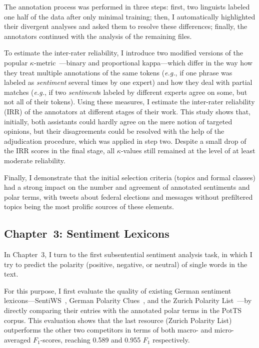 \documentclass[11pt]{article}
\newcommand{\eg}{\textit{e.g.},}
\newcommand{\F}[0]{$F_1$}
\renewcommand{\cite}{\citep}
\begin{document}
The annotation process was performed in three steps: first, two
linguists labeled one half of the data after only minimal training;
then, I automatically highlighted their divergent analyses and asked
them to resolve these differences; finally, the annotators continued
with the analysis of the remaining files.

To estimate the inter-rater reliability, I introduce two modified
versions of the popular $\kappa$-metric~\cite{Cohen:60}---binary and
proportional kappa---which differ in the way how they treat multiple
annotations of the same tokens (\eg{} if one phrase was labeled as
\emph{sentiment} several times by one expert) and how they deal with
partial matches (\eg{} if two \emph{sentiment}s labeled by different
experts agree on some, but not all of their tokens).  Using these
measures, I estimate the inter-rater reliability (IRR) of the
annotators at different stages of their work.  This study shows that,
initially, both assistants could hardly agree on the mere notion of
targeted opinions, but their disagreements could be resolved with the
help of the adjudication procedure, which was applied in step two.
Despite a small drop of the IRR scores in the final stage, all
$\kappa$-values still remained at the level of at least moderate
reliability.

Finally, I demonstrate that the initial selection criteria (topics and
formal classes) had a strong impact on the number and agreement of
annotated sentiments and polar terms, with tweets about federal
elections and messages without prefiltered topics being the most
prolific sources of these elements.

\subsection{Chapter~3: Sentiment Lexicons}

In Chapter~3, I turn to the first subsentential sentiment analysis
task, in which I try to predict the polarity (positive, negative, or
neutral) of single words in the text.

For this purpose, I first evaluate the quality of existing German
sentiment lexicons---SentiWS~\cite{Remus:10}, German Polarity
Clues~\cite{Waltinger:10}, and the Zurich Polarity
List~\cite{Clematide:10}---by directly comparing their entries with
the annotated polar terms in the PotTS corpus.  This evaluation shows
that the last resource (Zurich Polarity List) outperforms the other
two competitors in terms of both macro- and micro-averaged
\F{}-scores, reaching 0.589 and 0.955 \F{} respectively.
\end{document}
